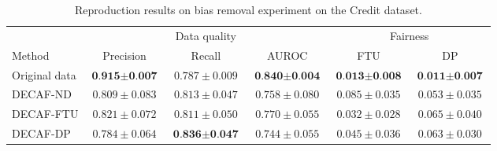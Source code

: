     \begin{table}[h]\centering
    \caption{Reproduction results on bias removal experiment on the Credit dataset.}
    \label{tab:exp2}
    \begin{tabular}{l|ccccc}
        
    \hline 
                    & \multicolumn{3}{c|}{Data quality}                & \multicolumn{2}{c}{Fairness} \\ \cline{2-6} 
    Method          & Precision & Recall & \multicolumn{1}{c|}{AUROC} & FTU           & DP           \\ \hline   
    Original data & $\textbf{0.915$\pm$0.007}$     & $0.787\pm0.009$  & \multicolumn{1}{c|}{$\textbf{0.840$\pm$0.004} $} & $\textbf{0.013$\pm$0.008}$  & $\textbf{0.011$\pm$0.007}$      \\
    DECAF-ND        & $0.809\pm0.083$     & $0.813\pm0.047$  & \multicolumn{1}{c|}{$0.758\pm0.080$} & $0.085\pm0.035$          & $0.053\pm0.035$        \\
    DECAF-FTU       & $0.821\pm0.072$     & $0.811\pm0.050$  & \multicolumn{1}{c|}{$0.770\pm0.055$} & $0.032\pm0.028$           & $0.065\pm0.040$       \\
    DECAF-DP        & $0.784\pm0.064$     & $\textbf{0.836$\pm$0.047}$  &  \multicolumn{1}{c|}{$0.744\pm0.055$} & $0.045\pm0.036$       & $0.063\pm0.030$     \\ 
    \hline
    \end{tabular}
    \end{table}
